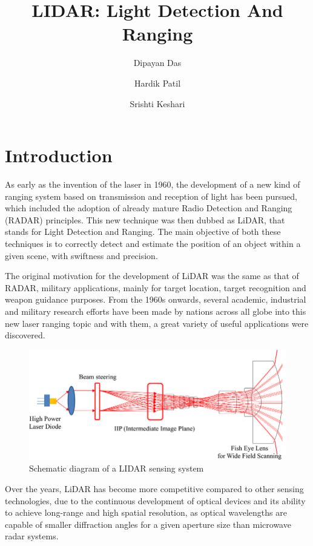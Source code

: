 \documentclass{article}
\title{\textbf{LIDAR: Light Detection And Ranging}}
\author[1]{Dipayan Das}
\author[2]{Hardik Patil}
\author[3]{Srishti Keshari}
\affil[1]{Department of Metallurgical Engineering And Materials Science, IITB}
\affil[2]{Department of Metallurgical Engineering And Materials Science, IITB}
\affil[3]{Department of Chemistry, IITB}
\begin{document}
\maketitle


\section{Introduction}
As early as the invention of the laser in 1960, the development of a new kind of ranging system based on transmission and reception of light has been pursued, which included the adoption of already mature Radio Detection and Ranging (RADAR) principles. This new technique was then dubbed as LiDAR, that stands for Light Detection and Ranging. The main objective of both these techniques is to correctly detect and estimate the position of an object within a given scene, with swiftness and precision.

The original motivation for the development of LiDAR was the same as that of RADAR, military applications, mainly for target location, target recognition and weapon guidance purposes. From the 1960s onwards, several academic, industrial and military research efforts have been made by nations across all globe into this new laser ranging topic and with them, a great variety of useful applications were discovered.

\begin{figure}[h!]
\centering
\includegraphics[width=1\textwidth]{Lidar Schematic.png}
\caption{\label{fig:xrd}Schematic diagram of a LIDAR sensing system\cite{lidarschematic}}
\end{figure}

Over the years, LiDAR has become more competitive compared to other sensing technologies, due to the continuous development of optical devices and its ability to achieve long-range and high spatial resolution, as optical wavelengths are capable of smaller diffraction angles for a given aperture size than microwave radar systems\cite{9435580}.
\end{document}
